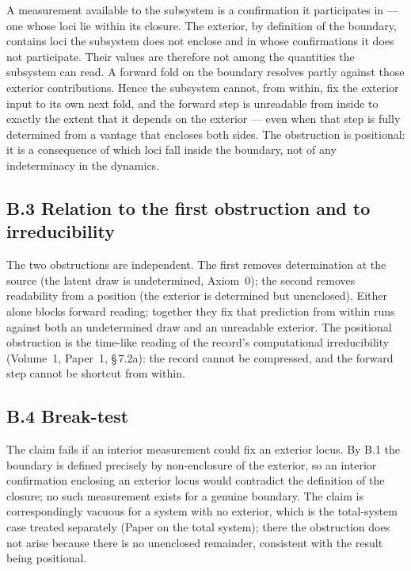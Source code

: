 \documentclass[11pt,oneside]{report}
\theoremstyle{definition}
\theoremstyle{remark}
\begin{document}
A measurement available to the subsystem is a confirmation it participates
in --- one whose loci lie within its closure. The exterior, by definition
of the boundary, contains loci the subsystem does not enclose and in whose
confirmations it does not participate. Their values are therefore not
among the quantities the subsystem can read. A forward fold on the
boundary resolves partly against those exterior contributions. Hence the
subsystem cannot, from within, fix the exterior input to its own next
fold, and the forward step is unreadable from inside to exactly the extent
that it depends on the exterior --- even when that step is fully determined
from a vantage that encloses both sides. The obstruction is positional: it
is a consequence of which loci fall inside the boundary, not of any
indeterminacy in the dynamics.

\subsection*{B.3 Relation to the first obstruction and to irreducibility}

The two obstructions are independent. The first removes determination at
the source (the latent draw is undetermined, Axiom~0); the second removes
readability from a position (the exterior is determined but unenclosed).
Either alone blocks forward reading; together they fix that prediction
from within runs against both an undetermined draw and an unreadable
exterior. The positional obstruction is the time-like reading of the
record's computational irreducibility (Volume~1, Paper~1, \S\,7.2a): the
record cannot be compressed, and the forward step cannot be shortcut from
within.

\subsection*{B.4 Break-test}

The claim fails if an interior measurement could fix an exterior locus. By
B.1 the boundary is defined precisely by non-enclosure of the exterior, so
an interior confirmation enclosing an exterior locus would contradict the
definition of the closure; no such measurement exists for a genuine
boundary. The claim is correspondingly vacuous for a system with no
exterior, which is the total-system case treated separately (Paper on the
total system); there the obstruction does not arise because there is no
unenclosed remainder, consistent with the result being positional.
\end{document}
